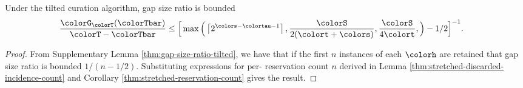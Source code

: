 \begin{theorem}
\label{thm:tilted-gap-size}
Under the tilted curation algorithm, gap size ratio is bounded
\begin{align*}
  \frac{\colorG_{\colorT}(\colorTbar)}{\colorT - \colorTbar}
  &\leq
  \Big[
    \max\Big(
      \left\lceil 2^{\colors - \colortau - 1} \right\rceil,
      \frac{\colorS}{2(\colort + \colors)},
      \frac{\colorS}{4\colort},
    \Big)
    - 1/2
  \Big]^{-1}.
\end{align*}
\end{theorem}
\begin{proof}

From Supplementary Lemma \ref{thm:gap-size-ratio-tilted}, we have that if the first $n$ instances of each \hv{} $\colorh$ are retained that gap size ratio is bounded $1/(n - 1/2)$.
Substituting expressions for per-\hv{} reservation count $n$ derived in Lemma \ref{thm:stretched-discarded-incidence-count} and Corollary \ref{thm:stretched-reservation-count} gives the result.
\end{proof}
